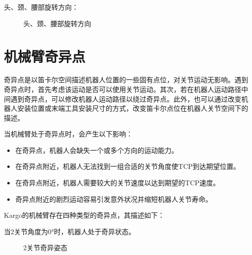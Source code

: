 \documentclass[a4paper,11pt,english,openany,oneside]{sphinxmanual}
\begin{document}
\sphinxAtStartPar
头、颈、腰部旋转方向：

\begin{figure}[H]
\centering
\capstart

\noindent{}
\caption{头、颈、腰部旋转方向}\label{\detokenize{07 _u6280_u672f_u89c4_u683c:id83}}\end{figure}




\section{机械臂奇异点}
\label{\detokenize{07 _u6280_u672f_u89c4_u683c:id47}}\label{\detokenize{07 _u6280_u672f_u89c4_u683c:id48}}
\sphinxAtStartPar
奇异点是以笛卡尔空间描述机器人位置的一些固有点位，对关节运动无影响。遇到奇异点时，首先考虑该运动是否可以使用关节运动。其次，若在机器人运动路径中间遇到奇异点，可以修改机器人运动路径以绕过奇异点。此外，也可以通过改变机器人安装位置或末端工具安装尺寸的方式，改变笛卡尔点位在机器人关节空间下的描述。

\sphinxAtStartPar
当机械臂处于奇异点时，会产生以下影响：
\begin{itemize}
\item {} 
\sphinxAtStartPar
在奇异点，机器人会缺失一个或多个方向的运动能力。

\item {} 
\sphinxAtStartPar
在奇异点附近，机器人无法找到一组合适的关节角度使TCP到达期望位置。

\item {} 
\sphinxAtStartPar
在奇异点附近，机器人需要较大的关节速度以达到期望的TCP速度。

\item {} 
\sphinxAtStartPar
奇异点附近的剧烈运动容易引发意外状况并缩短机器人关节寿命。

\end{itemize}

\sphinxAtStartPar
Kargo的机械臂存在四种类型的奇异点，其描述如下：

\sphinxAtStartPar
{} 当2关节角度为0°时，机器人处于奇异状态。

\begin{figure}[H]
\centering
\capstart

\noindent{}
\caption{2关节奇异姿态}\label{\detokenize{07 _u6280_u672f_u89c4_u683c:id84}}\end{figure}
\end{document}
